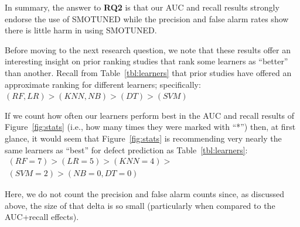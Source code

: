 \documentclass[sigconf,review, anonymous]{acmart}
\theoremstyle{break}
\theoremstyle{break}
\newcommand{\smb}{{\sc SMOTUNED}}
\begin{document}
In summary, the answer to {\bf RQ2} is that our  AUC and recall results strongly endorse the  use of {\smb}
while the precision and false alarm rates
show there is little harm in using {\smb}.

Before moving to the next research question, we note that these
 results offer an interesting insight on prior ranking studies that rank some learners
as ``better'' than another.
Recall from Table~\ref{tbl:learners} that prior studies have offered an approximate ranking for different learners; specifically: $
(\mathit{RF},\mathit{LR}) > (\mathit{KNN},\mathit{NB}) > (\mathit{DT}) > (\mathit{SVM})$

If we count how often our learners perform
best in the AUC and recall results of Figure~\ref{fig:stats} (i.e., how many times they were marked with ``*'') then, at first
glance, it would seem that Figure~\ref{fig:stats} is recommending very nearly the same
learners as ``best'' for defect prediction as   Table~\ref{tbl:learners}: $\begin{array}{c}
(\mathit{RF}=7) > (\mathit{LR}=5) > (\mathit{KNN}=4) >\\
(\mathit{SVM}=2) > (\mathit{NB}=0, \mathit{DT}=0)
\end{array}$

Here, we do not count  the precision and false alarm counts since, as discussed above, the size
of that delta is so small (particularly when compared to the AUC+recall effects).
\end{document}

